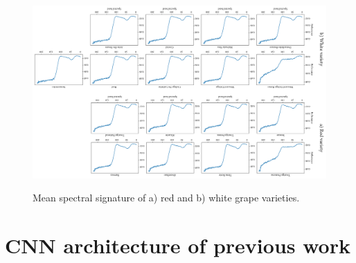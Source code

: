 \begin{figure}[bp]
    \centering
    {\includegraphics[width=\linewidth, angle=-180]{figs/vineyard_classification/vineyard_signature_grid.png}}
	\caption{Mean spectral signature of a) red and b) white grape varieties. }
	\label{fig:vineyard_mean_grid}
\end{figure}

\section{CNN architecture of previous work}

